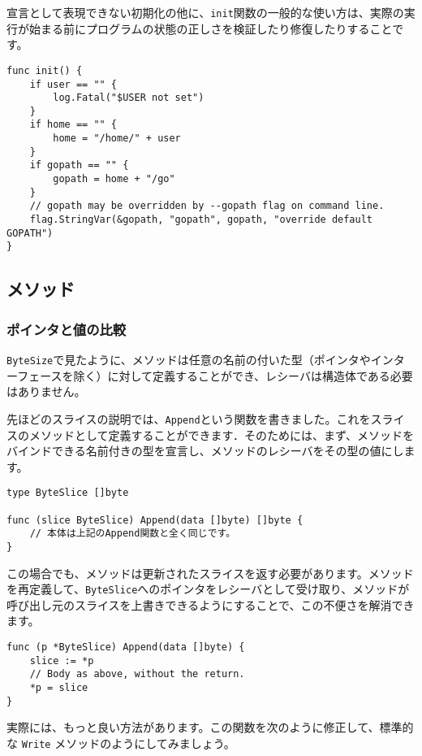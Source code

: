\documentclass{jsarticle}
\begin{document}
宣言として表現できない初期化の他に、\texttt{init}関数の一般的な使い方は、実際の実行が始まる前にプログラムの状態の正しさを検証したり修復したりすることです。

\begin{lstlisting}[numbers=none]
func init() {
    if user == "" {
        log.Fatal("$USER not set")
    }
    if home == "" {
        home = "/home/" + user
    }
    if gopath == "" {
        gopath = home + "/go"
    }
    // gopath may be overridden by --gopath flag on command line.
    flag.StringVar(&gopath, "gopath", gopath, "override default GOPATH")
}
\end{lstlisting}

\subsection{メソッド}

\subsubsection{ポインタと値の比較}

\texttt{ByteSize}で見たように、メソッドは任意の名前の付いた型（ポインタやインターフェースを除く）に対して定義することができ、レシーバは構造体である必要はありません。

先ほどのスライスの説明では、\texttt{Append}という関数を書きました。これをスライスのメソッドとして定義することができます．そのためには、まず、メソッドをバインドできる名前付きの型を宣言し、メソッドのレシーバをその型の値にします。

\begin{lstlisting}[numbers=none]
type ByteSlice []byte

func (slice ByteSlice) Append(data []byte) []byte {
    // 本体は上記のAppend関数と全く同じです。
}
\end{lstlisting}

この場合でも、メソッドは更新されたスライスを返す必要があります。メソッドを再定義して、\texttt{ByteSlice}へのポインタをレシーバとして受け取り、メソッドが呼び出し元のスライスを上書きできるようにすることで、この不便さを解消できます。

\begin{lstlisting}[numbers=none]
func (p *ByteSlice) Append(data []byte) {
    slice := *p
    // Body as above, without the return.
    *p = slice
}
\end{lstlisting}

実際には、もっと良い方法があります。この関数を次のように修正して、標準的な
\texttt{Write} メソッドのようにしてみましょう。
\end{document}
